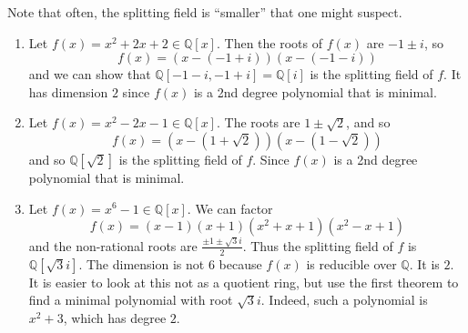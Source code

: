   \begin{example}
    Note that often, the splitting field is ``smaller'' that one might suspect. 
    \begin{enumerate}
      \item Let $f(x) = x^2 + 2x + 2 \in \mathbb{Q}[x]$. Then the roots of $f(x)$ are $-1 \pm i$, so 
      \begin{equation}
        f(x) = (x - (-1 + i)) (x - (-1 - i)) 
      \end{equation}
      and we can show that $\mathbb{Q}[-1 - i, -1+i] = \mathbb{Q}[i]$ is the splitting field of $f$. It has dimension $2$ since $f(x)$ is a 2nd degree polynomial that is minimal. 

      \item Let $f(x) = x^2 - 2x - 1 \in \mathbb{Q}[x]$. The roots are $1 \pm \sqrt{2}$, and so 
      \begin{equation}
        f(x) = (x - (1 + \sqrt{2})) (x - (1 - \sqrt{2}))
      \end{equation}
      and so $\mathbb{Q}[\sqrt{2}]$ is the splitting field of $f$. Since $f(x)$ is a 2nd degree polynomial that is minimal. 

      \item Let $f(x) = x^6 - 1 \in \mathbb{Q}[x]$. We can factor 
      \begin{equation}
        f(x) = (x-1) (x + 1) (x^2 + x + 1) (x^2 - x + 1)
      \end{equation} 
      and the non-rational roots are $\frac{\pm 1 \pm \sqrt{3} i}{2}$. Thus the splitting field of $f$ is $\mathbb{Q}[\sqrt{3} i]$. The dimension is not 6 because $f(x)$ is reducible over $\mathbb{Q}$. It is $2$. It is easier to look at this not as a quotient ring, but use the first theorem to find a minimal polynomial with root $\sqrt{3} i$. Indeed, such a polynomial is $x^2 + 3$, which has degree $2$. 


\end{enumerate}
\end{example}
